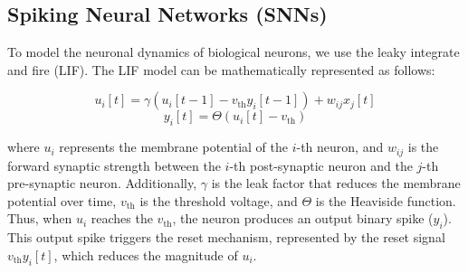 \documentclass[10pt]{article} %
\begin{document}
    \subsection{Spiking Neural Networks (SNNs)}\label{sec:snn}
    To model the neuronal dynamics of biological neurons, we use the leaky integrate and fire (LIF). 
    The LIF model can be mathematically represented as follows:
    
    \begin{equation}
        \label{eq:lif_integrate}
        u_{i}[t] = \gamma (u_{i}[t-1] - v_{\text{th}}y_{i}[t-1]) + w_{ij}x_{j}[t]%
    \end{equation}
    \begin{equation}
        \label{eq:lif_fire}
        y_{i}[t] = \Theta(u_{i}[t]-v_{\text{th}})
    \end{equation}
    
    where $u_i$ represents the membrane potential of the $i$-th neuron, and $w_{ij}$ is the forward synaptic strength between the $i$-th post-synaptic neuron and the $j$-th pre-synaptic neuron.
    Additionally, $\gamma$ is the leak factor that reduces the membrane potential over time, $v_{\text{th}}$ is the threshold voltage, and $\Theta$ is the Heaviside function.
    Thus, when $u_i$ reaches the $v_{\text{th}}$, the neuron produces an output binary spike ($y_i$).
    This output spike triggers the reset mechanism, represented by the reset signal $v_{\text{th}}y_{i}[t]$, which reduces the magnitude of $u_i$.
        
\end{document}
